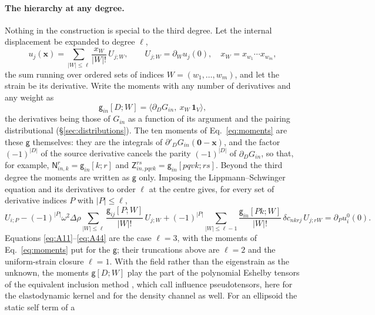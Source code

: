 \documentclass[11pt,a4paper]{article}
\begin{document}
\paragraph{The hierarchy at any degree.} Nothing in the construction is special to the third degree.
Let the internal displacement be expanded to degree $\ell$,
\begin{equation}\label{eq:taylorfield}
  u_j(\mathbf x)=\sum_{|W|\le\ell}\frac{x_W}{|W|!}\,U_{j;W},\qquad
  U_{j;W}=\partial_Wu_j(0),\quad x_W=x_{w_1}\cdots x_{w_m},
\end{equation}
the sum running over ordered sets of indices $W=(w_1,\dots,w_m)$, and let the strain be its derivative.
Write the moments with any number of derivatives and any weight as
\begin{equation}\label{eq:gmoment}
  \mathsf g_{in}[D;W]=\bigl\langle\partial_DG_{in},\ x_W\,\mathbf 1_V\bigr\rangle ,
\end{equation}
the derivatives being those of $G_{in}$ as a function of its argument and the pairing distributional
(\S\ref{sec:distributions}). The ten moments of Eq.~\eqref{eq:moments} are these $\mathsf g$
themselves: they are the integrals of $\partial'_D G_{in}(\mathbf 0-\mathbf x)$, and the factor
$(-1)^{|D|}$ of the source derivative cancels the parity $(-1)^{|D|}$ of $\partial_DG_{in}$, so that,
for example, $\mathsf N^r_{in,k}=\mathsf g_{in}[k;r]$ and $\mathsf Z^{rs}_{in,pqvk}=\mathsf
g_{in}[pqvk;rs]$. Beyond the third degree the moments are written as $\mathsf g$ only. Imposing the Lippmann--Schwinger
equation and its derivatives to order $\ell$ at the centre gives, for every set of derivative indices
$P$ with $|P|\le\ell$,
\begin{equation}\label{eq:hierarchy}
  U_{i;P}-(-1)^{|P|}\omega^2\Delta\rho\sum_{|W|\le\ell}\frac{\mathsf g_{ij}[P;W]}{|W|!}\,U_{j;W}
  +(-1)^{|P|}\sum_{|W|\le\ell-1}\frac{\mathsf g_{in}[Pk;W]}{|W|!}\,\delta c_{nkrj}\,U_{j;rW}
  =\partial_Pu^0_i(0).
\end{equation}
Equations \eqref{eq:A11}--\eqref{eq:A44} are the case $\ell=3$, with the moments of
Eq.~\eqref{eq:moments} put for the $\mathsf g$; their truncations above are $\ell=2$ and the
uniform-strain closure $\ell=1$. With the field rather than the eigenstrain as the unknown, the
moments $\mathsf g[D;W]$ play the part of the polynomial Eshelby tensors of the equivalent inclusion
method \citep[Ch.~4]{Mura1987}, which \citet{Brisard2014} call influence pseudotensors, here for the
elastodynamic kernel and for the density channel as well. For an ellipsoid the static self term of a
\end{document}
